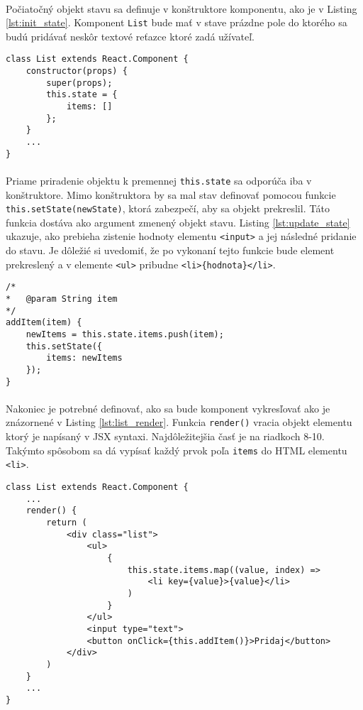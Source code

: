 \paragraph{}
Počiatočný objekt stavu sa definuje v konštruktore komponentu, ako je v Listing \ref{lst:init_state}. Komponent \texttt{List} bude mať v stave prázdne pole do ktorého sa budú pridávať neskôr textové reťazce ktoré zadá užívateľ.

\begin{lstlisting}[caption={Definovanie stavu v konštruktore komponentu},label={lst:init_state}]
class List extends React.Component {
	constructor(props) {
		super(props);
		this.state = {
			items: []
		};
	}
	...
}
\end{lstlisting}

\paragraph{}
Priame priradenie objektu k premennej \texttt{this.state} sa odporúča iba v konštruktore. Mimo konštruktora by sa mal stav definovať pomocou funkcie \texttt{this.setState(newState)}, ktorá zabezpečí, aby sa objekt prekreslil. Táto funkcia dostáva ako argument zmenený objekt stavu. Listing \ref{lst:update_state} ukazuje, ako prebieha zistenie hodnoty elementu \texttt{<input>} a jej následné pridanie do stavu. Je dôležié si uvedomiť, že po vykonaní tejto funkcie bude element prekreslený a v elemente \texttt{<ul>} pribudne \texttt{<li>\{hodnota\}</li>}.

\begin{lstlisting}[caption={Zmena stavu komponentu pomocou funkcie \texttt{this.setState()}},label={lst:update_state}]
/*
*	@param String item
*/
addItem(item) {
	newItems = this.state.items.push(item);
	this.setState({
		items: newItems
	});
}
\end{lstlisting}

\paragraph{}
Nakoniec je potrebné definovať, ako sa bude komponent vykresľovať ako je znázornené v Listing \ref{lst:list_render}. Funkcia \texttt{render()} vracia objekt elementu ktorý je napísaný v JSX syntaxi. Najdôležitejšia časť je na riadkoch 8-10. Takýmto spôsobom sa dá vypísať každý prvok poľa \texttt{items} do HTML elementu \texttt{<li>}.

\begin{lstlisting}[caption={Vykresľovanie komponentu \texttt{List}},label={lst:list_render}]
class List extends React.Component {
	...
	render() {
		return (
			<div class="list">
				<ul>
					{
						this.state.items.map((value, index) => 
							<li key={value}>{value}</li>					
						)				
					}
				</ul>
				<input type="text">
				<button onClick={this.addItem()}>Pridaj</button>
			</div>	
		)
	}
	...
} 
\end{lstlisting}





